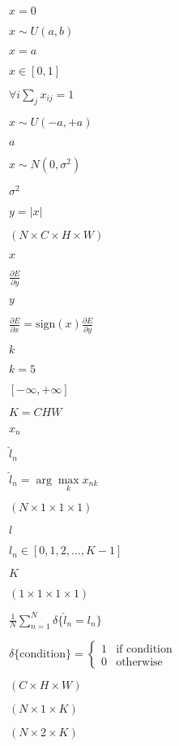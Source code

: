 \documentclass{article}
\begin{document}
$ x = 0 $
\pagebreak

$ x\sim U(a, b) $
\pagebreak

$ x = a $
\pagebreak

$ x \in [0, 1] $
\pagebreak

$ \forall i \sum_j x_{ij} = 1 $
\pagebreak

$ x \sim U(-a, +a) $
\pagebreak

$ a $
\pagebreak

$ x \sim N(0, \sigma^2) $
\pagebreak

$ \sigma^2 $
\pagebreak

$ y = |x| $
\pagebreak

$ (N \times C \times H \times W) $
\pagebreak

$ x $
\pagebreak

$ \frac{\partial E}{\partial y} $
\pagebreak

$ y $
\pagebreak

$ \frac{\partial E}{\partial x} = \mathrm{sign}(x) \frac{\partial E}{\partial y} $
\pagebreak

$ k $
\pagebreak

$ k = 5 $
\pagebreak

$ [-\infty, +\infty] $
\pagebreak

$ K = CHW $
\pagebreak

$ x_n $
\pagebreak

$ \hat{l}_n $
\pagebreak

$ \hat{l}_n = \arg\max\limits_k x_{nk} $
\pagebreak

$ (N \times 1 \times 1 \times 1) $
\pagebreak

$ l $
\pagebreak

$ l_n \in [0, 1, 2, ..., K - 1] $
\pagebreak

$ K $
\pagebreak

$ (1 \times 1 \times 1 \times 1) $
\pagebreak

$ \frac{1}{N} \sum\limits_{n=1}^N \delta\{ \hat{l}_n = l_n \} $
\pagebreak

$ \delta\{\mathrm{condition}\} = \left\{ \begin{array}{lr} 1 & \mbox{if condition} \\ 0 & \mbox{otherwise} \end{array} \right. $
\pagebreak

$ (C \times H \times W) $
\pagebreak

$ (N \times 1 \times K) $
\pagebreak

$ (N \times 2 \times K) $
\pagebreak
\end{document}
